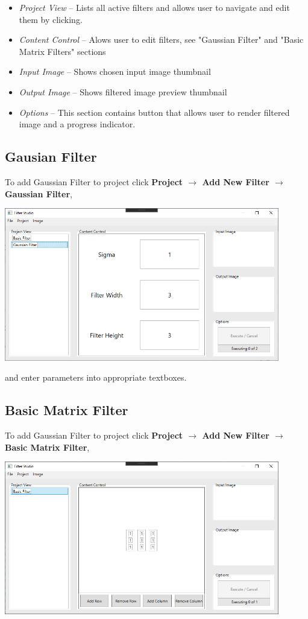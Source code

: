 \documentclass{article}
\begin{document}
\begin{itemize}
    \item \emph{Project View} -- Lists all active filters and allows user to navigate and edit them by clicking.
    \item \emph{Content Control} -- Alows user to edit filters, see "Gaussian Filter" and "Basic Matrix Filters" sections
    \item \emph{Input Image} -- Shows chosen input image thumbnail
    \item \emph{Output Image} -- Shows filtered image preview thumbnail
    \item \emph{Options} -- This section contains button that allows user to render filtered image and a progress indicator.
\end{itemize}

\newpage
\subsection{Gausian Filter}
To add Gaussian Filter to project click \textbf{Project $\rightarrow$ Add New Filter $\rightarrow$ Gaussian Filter},

\bigskip
\includegraphics[width=0.9\textwidth]{gauss.png}
\bigskip

and enter parameters into appropriate textboxes.

\subsection{Basic Matrix Filter}
To add Gaussian Filter to project click \textbf{Project $\rightarrow$ Add New Filter $\rightarrow$ Basic Matrix Filter},

\bigskip
\includegraphics[width=0.9\textwidth]{matrix.png}
\bigskip
\end{document}
